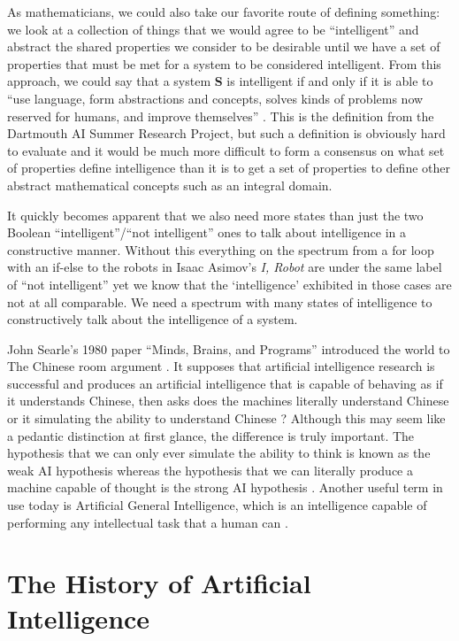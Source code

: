 \documentclass[oneside,12pt,openany]{book}
\begin{document}
	As mathematicians, we could also take our favorite route of defining something: we look at a collection of things that we would agree to be ``intelligent'' and abstract the shared properties we consider to be desirable until we have a set of properties that must be met for a system to be considered intelligent. From this approach, we could say that a system \textbf{S} is intelligent if and only if it is able to ``use language, form abstractions and concepts, solves kinds of problems now reserved for humans, and improve themselves'' \cite{Jones}. This is the definition from the Dartmouth AI Summer Research Project, but such a definition is obviously hard to evaluate and it would be much more difficult to form a consensus on what set of properties define intelligence than it is to get a set of properties to define other abstract mathematical concepts such as an integral domain.
	
	It quickly becomes apparent that we also need more states than just the two Boolean ``intelligent''/``not intelligent'' ones to talk about intelligence in a constructive manner. Without this everything on the spectrum from a for loop with an if-else to the robots in Isaac Asimov's \textit{I, Robot}  are under the same label of ``not intelligent'' yet we know that the `intelligence' exhibited in those cases are not at all comparable. We need a spectrum with many states of intelligence to constructively talk about the intelligence of a system.
	
	John Searle's 1980 paper ``Minds, Brains, and Programs'' introduced the world to The Chinese room argument \cite{Searle}. It supposes that artificial intelligence research is successful and produces an artificial intelligence that is capable of behaving as if it understands Chinese, then asks does the machines literally understand Chinese or it simulating the ability to understand Chinese \cite{Searle}? Although this may seem like a pedantic distinction at first glance, the difference is truly important. The hypothesis that we can only ever simulate the ability to think is known as the weak AI hypothesis whereas the hypothesis that we can literally produce a machine capable of thought is the strong AI hypothesis \cite{Jones}. Another useful term in use today is Artificial General Intelligence, which is an intelligence capable of performing any intellectual task that a human can \cite{Buchanan}.
	
	\section{The History of Artificial Intelligence}
	
\end{document}
